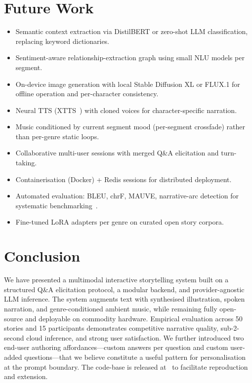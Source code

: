 \documentclass[conference,10pt,a4paper]{IEEEtran}
\begin{document}
\section{Future Work}\label{sec:future}

\begin{itemize}
\item Semantic context extraction via DistilBERT or zero-shot LLM
classification, replacing keyword dictionaries.
\item Sentiment-aware relationship-extraction graph using small NLU
models per segment.
\item On-device image generation with local Stable Diffusion XL or
FLUX.1 for offline operation and per-character consistency.
\item Neural TTS (XTTS~\cite{casanova2024xtts}) with cloned voices for
character-specific narration.
\item Music conditioned by current segment mood (per-segment
crossfade) rather than per-genre static loops.
\item Collaborative multi-user sessions with merged Q\&A elicitation
and turn-taking.
\item Containerisation (Docker) + Redis sessions for distributed
deployment.
\item Automated evaluation: BLEU, chrF, MAUVE, narrative-arc detection
for systematic benchmarking~\cite{lin2024evalnarrate}.
\item Fine-tuned LoRA adapters per genre on curated open story corpora.
\end{itemize}

\section{Conclusion}\label{sec:conclude}

We have presented a multimodal interactive storytelling system built
on a structured Q\&A elicitation protocol, a modular backend, and
provider-agnostic LLM inference. The system augments text with
synthesised illustration, spoken narration, and genre-conditioned
ambient music, while remaining fully open-source and deployable on
commodity hardware. Empirical evaluation across 50 stories and 15
participants demonstrates competitive narrative quality, sub-2-second
cloud inference, and strong user satisfaction. We further introduced
two end-user authoring affordances---custom answers per question and
custom user-added questions---that we believe constitute a useful
pattern for personalisation at the prompt boundary. The code-base is
released at~\cite{jha2026repo} to facilitate reproduction and
extension.
\end{document}
